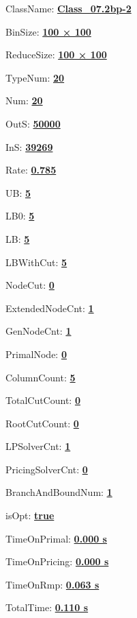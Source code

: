\documentclass[11pt]{article}
\begin{document}
\pagestyle{empty}


ClassName: \underline{\textbf{Class_07.2bp-2}}
\par
BinSize: \underline{\textbf{100 × 100}}
\par
ReduceSize: \underline{\textbf{100 × 100}}
\par
TypeNum: \underline{\textbf{20}}
\par
Num: \underline{\textbf{20}}
\par
OutS: \underline{\textbf{50000}}
\par
InS: \underline{\textbf{39269}}
\par
Rate: \underline{\textbf{0.785}}
\par
UB: \underline{\textbf{5}}
\par
LB0: \underline{\textbf{5}}
\par
LB: \underline{\textbf{5}}
\par
LBWithCut: \underline{\textbf{5}}
\par
NodeCut: \underline{\textbf{0}}
\par
ExtendedNodeCnt: \underline{\textbf{1}}
\par
GenNodeCnt: \underline{\textbf{1}}
\par
PrimalNode: \underline{\textbf{0}}
\par
ColumnCount: \underline{\textbf{5}}
\par
TotalCutCount: \underline{\textbf{0}}
\par
RootCutCount: \underline{\textbf{0}}
\par
LPSolverCnt: \underline{\textbf{1}}
\par
PricingSolverCnt: \underline{\textbf{0}}
\par
BranchAndBoundNum: \underline{\textbf{1}}
\par
isOpt: \underline{\textbf{true}}
\par
TimeOnPrimal: \underline{\textbf{0.000 s}}
\par
TimeOnPricing: \underline{\textbf{0.000 s}}
\par
TimeOnRmp: \underline{\textbf{0.063 s}}
\par
TotalTime: \underline{\textbf{0.110 s}}
\par
\newpage


\end{document}
